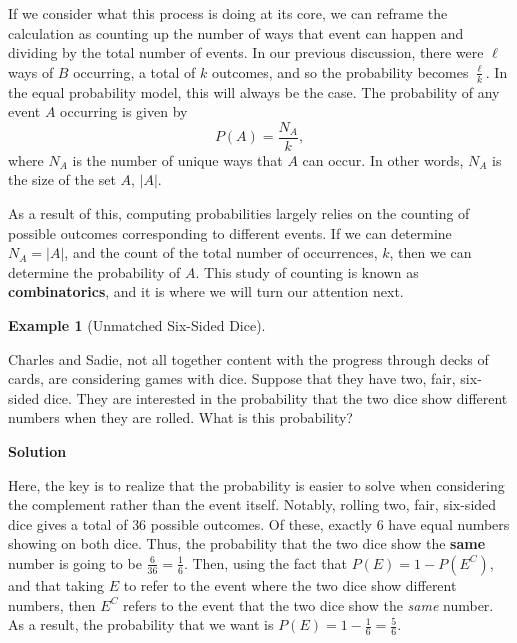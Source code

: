 \documentclass[
  letterpaper,
  DIV=11,
  numbers=noendperiod]{scrreprt}
\theoremstyle{definition}
\theoremstyle{definition}
\newtheorem{example}{Example}[chapter]
\theoremstyle{definition}
\theoremstyle{remark}
\begin{document}
If we consider what this process is doing at its core, we can reframe
the calculation as counting up the number of ways that event can happen
and dividing by the total number of events. In our previous discussion,
there were \(\ell\) ways of \(B\) occurring, a total of \(k\) outcomes,
and so the probability becomes \(\frac{\ell}{k}\). In the equal
probability model, this will always be the case. The probability of any
event \(A\) occurring is given by \[P(A) = \frac{N_A}{k},\] where
\(N_A\) is the number of unique ways that \(A\) can occur. In other
words, \(N_A\) is the size of the set \(A\), \(|A|\).

As a result of this, computing probabilities largely relies on the
counting of possible outcomes corresponding to different events. If we
can determine \(N_A = |A|\), and the count of the total number of
occurrences, \(k\), then we can determine the probability of \(A\). This
study of counting is known as \textbf{combinatorics}, and it is where we
will turn our attention next.

\begin{example}[Unmatched Six-Sided
Dice]\protect\hypertarget{exm-complement-trick}{}\label{exm-complement-trick}

Charles and Sadie, not all together content with the progress through
decks of cards, are considering games with dice. Suppose that they have
two, fair, six-sided dice. They are interested in the probability that
the two dice show different numbers when they are rolled. What is this
probability?

\begin{tcolorbox}[enhanced jigsaw, colback=white, colframe=quarto-callout-color-frame, arc=.35mm, leftrule=.75mm, rightrule=.15mm, opacityback=0, breakable, bottomrule=.15mm, left=2mm, toprule=.15mm]

\vspace{-3mm}\textbf{Solution}\vspace{3mm}

Here, the key is to realize that the probability is easier to solve when
considering the complement rather than the event itself. Notably,
rolling two, fair, six-sided dice gives a total of \(36\) possible
outcomes. Of these, exactly \(6\) have equal numbers showing on both
dice. Thus, the probability that the two dice show the \textbf{same}
number is going to be \(\frac{6}{36} = \frac{1}{6}\). Then, using the
fact that \(P(E) = 1 - P(E^C)\), and that taking \(E\) to refer to the
event where the two dice show different numbers, then \(E^C\) refers to
the event that the two dice show the \emph{same} number. As a result,
the probability that we want is
\(P(E) = 1 - \frac{1}{6} = \frac{5}{6}\).

\end{tcolorbox}

\end{example}
\end{document}
